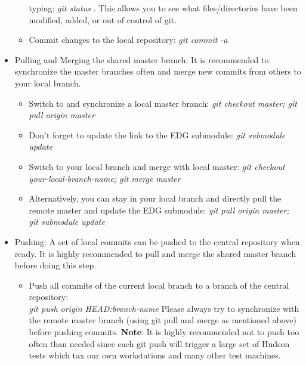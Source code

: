 \begin{itemize}
\begin{itemize}
          typing:
          \textit{git status}  .  This allows you to see what
          files/directories have been
          modified, added, or out of control of git. 
          \item Commit changes to the local repository: \textit{git commit -a} 
   \end{itemize}   
\item Pulling and Merging the shared master branch: It is recommended to synchronize the master branches often and merge new commits from others to  your local branch. 
   \begin{itemize}
          \item Switch to and synchronize a local master branch: \textit{git checkout master; git pull origin master}
          \item Don't forget to update the link to the EDG submodule: \textit{git submodule update}
          \item Switch to your local branch and merge with local master: \textit{git checkout your-local-branch-name; git merge master}
    \item Alternatively, you can stay in your local branch and directly pull the remote master and update the EDG submodule: 
           \textit{git pull origin master; git submodule update}
   \end{itemize}   

\item Pushing: A set of local commits can be pushed to the central repository when ready.
It is highly recommended to pull and merge the shared master branch before doing this step.
   \begin{itemize}
          \item Push all commits of the current local branch to a branch of the central repository:\\ \textit{git push origin HEAD:branch-name}
 Please always try to synchronize with the
          remote master branch (using git pull and merge as mentioned
          above) before pushing commits. \textbf{Note}: It is highly recommended not to push too often than
          needed since each git push will trigger a large set of
          Hudson tests which tax our own workstations and many other test machines.



\end{itemize}
\end{itemize}
